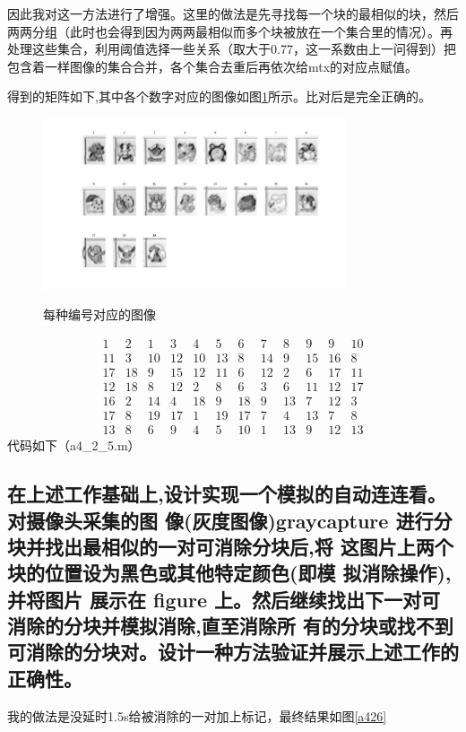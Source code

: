 \documentclass{ctexart}
\begin{document}
因此我对这一方法进行了增强。这里的做法是先寻找每一个块的最相似的块，然后两两分组（此时也会得到因为两两最相似而多个块被放在一个集合里的情况）。再处理这些集合，利用阈值选择一些关系（取大于0.77，这一系数由上一问得到）把包含着一样图像的集合合并，各个集合去重后再依次给mtx的对应点赋值。

得到的矩阵如下,其中各个数字对应的图像如图\ref{a425}所示。比对后是完全正确的。
\begin{figure}
    \centering
    \includegraphics[width=0.8\textwidth]{process/a425.jpg}\\
    \caption{每种编号对应的图像\label{a425}}
\end{figure}
\[\begin{array}{cccccccccccc}
1&2&1&3&4&5&6&7&8&9&9&10\\
11&3&10&12&10&13&8&14&9&15&16&8\\
17&18&9&15&12&11&6&12&2&6&17&11\\
12&18&8&12&2&8&6&3&6&11&12&17\\
16&2&14&4&18&9&18&9&13&7&12&3\\
17&8&19&17&1&19&17&7&4&13&7&8\\
13&8&6&9&4&5&10&1&13&9&12&13
\end{array}\]
代码如下（a4\_2\_5.m）


\subsection{
在上述工作基础上,设计实现一个模拟的自动连连看。对摄像头采集的图
像(灰度图像)graycapture 进行分块并找出最相似的一对可消除分块后,将
这图片上两个块的位置设为黑色或其他特定颜色(即模 拟消除操作),并将图片
展示在 figure 上。然后继续找出下一对可消除的分块并模拟消除,直至消除所
有的分块或找不到可消除的分块对。设计一种方法验证并展示上述工作的正确性。
}
我的做法是没延时1.5s给被消除的一对加上标记，最终结果如图\ref{a426}
\end{document}
